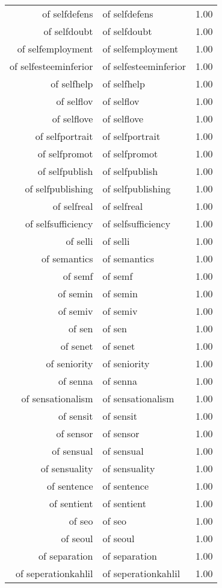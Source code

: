 \begin{table}[ht]
\begin{tabular}{rlr}
  of selfdefens & of selfdefens & 1.00 \\ 
  of selfdoubt & of selfdoubt & 1.00 \\ 
  of selfemployment & of selfemployment & 1.00 \\ 
  of selfesteeminferior & of selfesteeminferior & 1.00 \\ 
  of selfhelp & of selfhelp & 1.00 \\ 
  of selflov & of selflov & 1.00 \\ 
  of selflove & of selflove & 1.00 \\ 
  of selfportrait & of selfportrait & 1.00 \\ 
  of selfpromot & of selfpromot & 1.00 \\ 
  of selfpublish & of selfpublish & 1.00 \\ 
  of selfpublishing & of selfpublishing & 1.00 \\ 
  of selfreal & of selfreal & 1.00 \\ 
  of selfsufficiency & of selfsufficiency & 1.00 \\ 
  of selli & of selli & 1.00 \\ 
  of semantics & of semantics & 1.00 \\ 
  of semf & of semf & 1.00 \\ 
  of semin & of semin & 1.00 \\ 
  of semiv & of semiv & 1.00 \\ 
  of sen & of sen & 1.00 \\ 
  of senet & of senet & 1.00 \\ 
  of seniority & of seniority & 1.00 \\ 
  of senna & of senna & 1.00 \\ 
  of sensationalism & of sensationalism & 1.00 \\ 
  of sensit & of sensit & 1.00 \\ 
  of sensor & of sensor & 1.00 \\ 
  of sensual & of sensual & 1.00 \\ 
  of sensuality & of sensuality & 1.00 \\ 
  of sentence & of sentence & 1.00 \\ 
  of sentient & of sentient & 1.00 \\ 
  of seo & of seo & 1.00 \\ 
  of seoul & of seoul & 1.00 \\ 
  of separation & of separation & 1.00 \\ 
  of seperationkahlil & of seperationkahlil & 1.00 \\ 

\end{tabular}
\end{table}
